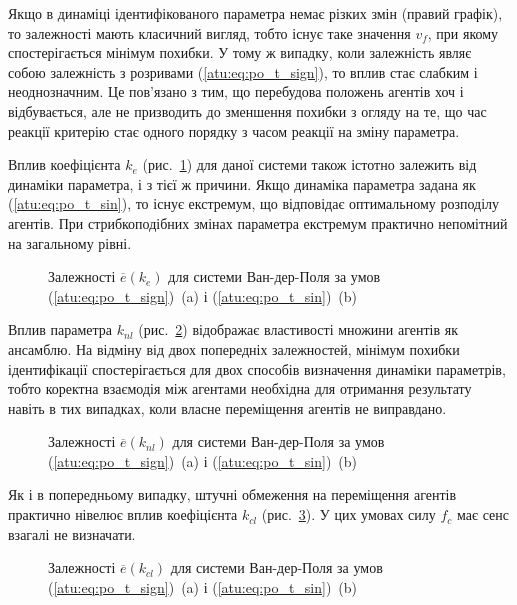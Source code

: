 Якщо в динаміці ідентифікованого параметра немає різких змін
(правий графік), то залежності мають класичний вигляд, тобто існує таке
значення $v_f$, при якому спостерігається мінімум похибки. У тому
ж випадку, коли залежність являє собою залежність з
розривами (\ref{atu:eq:po_t_sign}), то вплив стає слабким
і неоднозначним. Це пов'язано з тим, що перебудова положень
агентів хоч і відбувається, але не призводить до зменшення
похибки з огляду на те, що час реакції критерію стає одного
порядку з часом реакції на зміну параметра.


Вплив коефіцієнта
$k_e$ (рис.~\ref{atu:f:vdp_e_k_e}) для даної системи також істотно залежить
від динаміки параметра, і з тієї ж причини. Якщо динаміка
параметра задана як (\ref{atu:eq:po_t_sin}), то існує екстремум, що
відповідає оптимальному розподілу агентів. При стрибкоподібних
змінах параметра екстремум практично непомітний на загальному рівні.

\begin{figure}[ht!]
  \caption{Залежності $\overline{e}(k_e)$ для системи Ван-дер-Поля за умов (\ref{atu:eq:po_t_sign})~(a) і (\ref{atu:eq:po_t_sin})~(b)}
\label{atu:f:vdp_e_k_e}
\end{figure}

Вплив параметра
$k_{nl} $ (рис.~\ref{atu:f:vdp_e_k_nl}) відображає властивості множини агентів
як ансамблю. На відміну від двох попередніх залежностей, мінімум
похибки ідентифікації спостерігається для двох способів
визначення динаміки параметрів, тобто коректна взаємодія
між агентами необхідна для отримання результату навіть в тих
випадках, коли власне переміщення агентів не виправдано.

\begin{figure}[ht!]
  \caption{Залежності $\overline{e}(k_{nl})$ для системи Ван-дер-Поля за умов (\ref{atu:eq:po_t_sign})~(a) і (\ref{atu:eq:po_t_sin})~(b)}
\label{atu:f:vdp_e_k_nl}
\end{figure}

Як і в попередньому випадку, штучні обмеження на переміщення
агентів практично нівелює вплив коефіцієнта
$k_{cl}$ (рис.~\ref{atu:f:vdp_e_k_cl}). У цих умовах силу
$f_c$ має сенс взагалі не визначати.

\begin{figure}[ht!]
  \caption{Залежності $\overline{e}(k_{cl})$ для системи Ван-дер-Поля за умов (\ref{atu:eq:po_t_sign})~(a) і (\ref{atu:eq:po_t_sin})~(b)}
\label{atu:f:vdp_e_k_cl}
\end{figure}

